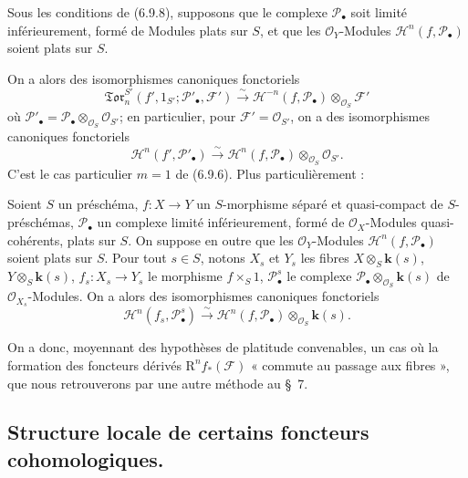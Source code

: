 \begin{corollary}[6.9.9]
Sous les conditions de \textup{(6.9.8)}, supposons que le complexe
$\mathscr P_\bullet$ soit limité inférieurement, formé de Modules plats sur
$S$, et que les $\mathscr O_Y$-Modules
$\mathscr H^n(f,\mathscr P_\bullet)$ soient plats sur $S$.

On a alors des isomorphismes canoniques fonctoriels
\[
  \mathfrak{Tor}_n^{S'}
  (f',1_{S'};\mathscr P'_\bullet,\mathscr F')
  \xrightarrow{\sim}
  \mathscr H^{-n}(f,\mathscr P_\bullet)
  \otimes_{\mathscr O_S}\mathscr F'
  \tag{6.9.9.1}\label{III.6.9.9.1.fr}
\]
où
$\mathscr P'_\bullet=\mathscr P_\bullet\otimes_{\mathscr O_S}
\mathscr O_{S'}$; en particulier, pour $\mathscr F'=\mathscr O_{S'}$, on a
des isomorphismes canoniques fonctoriels
\[
  \mathscr H^n(f',\mathscr P'_\bullet)
  \xrightarrow{\sim}
  \mathscr H^n(f,\mathscr P_\bullet)
  \otimes_{\mathscr O_S}\mathscr O_{S'}.
  \tag{6.9.9.2}\label{III.6.9.9.2.fr}
\]
\textup{C'est le cas particulier $m=1$ de (6.9.6). Plus particulièrement :}
\end{corollary}

\begin{corollary}[6.9.10]
Soient $S$ un préschéma, $f:X\to Y$ un $S$-morphisme séparé et
quasi-compact de $S$-préschémas, $\mathscr P_\bullet$ un complexe limité
inférieurement, formé de $\mathscr O_X$-Modules quasi-cohérents, plats sur
$S$. On suppose en outre que les $\mathscr O_Y$-Modules
$\mathscr H^n(f,\mathscr P_\bullet)$ soient plats sur $S$. Pour tout $s\in S$,
notons $X_s$ et $Y_s$ les fibres
$X\otimes_S \boldsymbol{k}(s)$, $Y\otimes_S \boldsymbol{k}(s)$,
$f_s:X_s\to Y_s$ le morphisme $f\times_S1$,
$\mathscr P_\bullet^s$ le complexe
$\mathscr P_\bullet\otimes_{\mathscr O_S}\boldsymbol{k}(s)$ de
$\mathscr O_{X_s}$-Modules. On a alors des isomorphismes canoniques
fonctoriels
\[
  \mathscr H^n(f_s,\mathscr P_\bullet^s)
  \xrightarrow{\sim}
  \mathscr H^n(f,\mathscr P_\bullet)\otimes_{\mathscr O_S}\boldsymbol{k}(s).
  \tag{6.9.10.1}\label{III.6.9.10.1.fr}
\]
\end{corollary}

On a donc, moyennant des hypothèses de platitude convenables, un cas où la
formation des foncteurs dérivés $\mathrm R^nf_*(\mathscr F)$ « commute au passage aux
fibres », que nous retrouverons par une autre méthode au §~7.

\subsection{Structure locale de certains foncteurs cohomologiques.}

